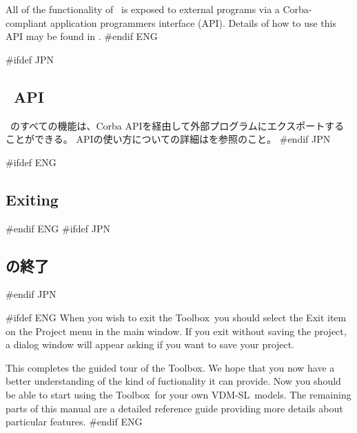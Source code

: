 \documentclass[\pformat,12pt]{article}
\newcommand{\vdmslpp}{VDM-SL}
\newcommand{\Toolbox}{Toolbox}
\newcommand{\vdmslpp}{VDM++}
\newcommand{\Toolbox}{Toolbox}
\newcommand{\guicmd}[1]{{\sf #1}}
\newcommand{\guicmd}[1]{{\gt #1}}
\begin{document}
All of the functionality of \VDMTools\ is exposed to external programs
via a Corba-compliant application programmers interface (API). Details
of how to use this API may be found in \cite{APIMan-CSK}.
#endif ENG

#ifdef JPN
\subsection{\protect\VDMTools\ API}

\VDMTools\ のすべての機能は、Corba APIを経由して外部プログラムにエクスポートすることができる。
APIの使い方についての詳細は\cite{APIMan-CSK}を参照のこと。
#endif JPN



#ifdef ENG
\subsection{Exiting \protect\VDMTools}
#endif ENG
#ifdef JPN
\subsection{\protect\VDMTools の終了}
#endif JPN

#ifdef ENG
When you wish to exit the \Toolbox\ you should select the
\guicmd{Exit} item on the \guicmd{Project} menu in
the main window. If you exit without saving the project, a dialog
window will appear asking if you want to save your project.

This completes the guided tour of the \Toolbox. We hope that you now have
a better understanding of the kind of fuctionality it can provide. Now
you should be able to start using the \Toolbox\ for your own
\vdmslpp\ models. The remaining parts of this manual are a detailed
reference guide providing more details about particular features.
#endif ENG
\end{document}
